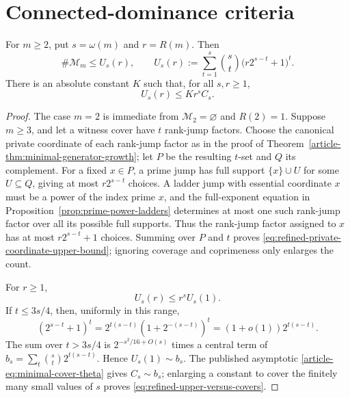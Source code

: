 \section{Connected-dominance criteria}
\label{sec:supp-connected-dominance}

\begin{lemma}
\label{lem:refined-private-coordinate-upper-bound}
For $m\ge2$, put $s=\omega(m)$ and $r=R(m)$. Then
\begin{equation}\label{eq:refined-private-coordinate-upper-bound}
 \#\mathcal M_m\le U_s(r),\qquad
 U_s(r):=\sum_{t=1}^s\binom st
             \bigl(r2^{s-t}+1\bigr)^t.
\end{equation}
There is an absolute constant $K$ such that, for all $s,r\ge1$,
\begin{equation}\label{eq:refined-upper-versus-covers}
 U_s(r)\le Kr^sC_s.
\end{equation}
\end{lemma}

\begin{proof}
The case $m=2$ is immediate from $\mathcal M_2=\varnothing$ and $R(2)=1$.
Suppose $m\ge3$, and let a witness cover have $t$ rank-jump factors. Choose the canonical
private coordinate of each rank-jump factor as in the proof of
Theorem~\ref{article-thm:minimal-generator-growth}; let $P$ be the resulting
$t$-set and $Q$ its complement. For a fixed $x\in P$, a prime jump has full
support $\{x\}\cup U$ for some $U\subseteq Q$, giving at most
$r2^{s-t}$ choices. A ladder jump with essential coordinate $x$ must be a
power of the index prime $x$, and the full-exponent equation in
Proposition~\ref{prop:prime-power-ladders} determines at most one such rank-jump factor
over all its possible full supports. Thus the rank-jump factor assigned to $x$ has at most
$r2^{s-t}+1$ choices. Summing over $P$ and $t$ proves
\eqref{eq:refined-private-coordinate-upper-bound}; ignoring coverage and
coprimeness only enlarges the count.

For $r\ge1$,
\[
 U_s(r)\le r^sU_s(1).
\]
If $t\le3s/4$, then, uniformly in this range,
\[
 (2^{s-t}+1)^t
 =2^{t(s-t)}(1+2^{-(s-t)})^t
 =(1+o(1))2^{t(s-t)}.
\]
The sum over $t>3s/4$ is
$2^{-s^2/16+O(s)}$ times a central term of
$b_s=\sum_t\binom st2^{t(s-t)}$. Hence $U_s(1)\sim b_s$. The published
asymptotic \eqref{article-eq:minimal-cover-theta} gives $C_s\sim b_s$; enlarging a
constant to cover the finitely many small values of $s$ proves
\eqref{eq:refined-upper-versus-covers}.
\end{proof}

